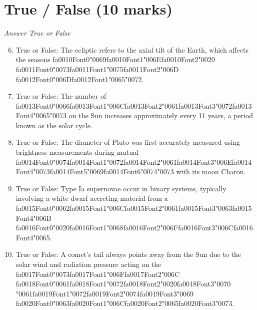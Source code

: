 \documentclass[12pt]{article}
\begin{document}
\section*{True / False (10 marks)}
\textit{Answer True or False}
\begin{enumerate}[label=\arabic*.]
\setcounter{enumi}{5}
\item True or False: The ecliptic refers to the axial tilt of the Earth, which affects the seasons {\csname fa0010Font0\endcsname\char"0069}{\csname fa0010Font1\endcsname\char"006E}{\csname fa0010Font2\endcsname\char"0020} {\csname fa0011Font0\endcsname\char"0073}{\csname fa0011Font1\endcsname\char"0075}{\csname fa0011Font2\endcsname\char"006D} {\csname fa0012Font0\endcsname\char"006D}{\csname fa0012Font1\endcsname\char"0065}{\char"0072}.
\item True or False: The number of {\csname fa0013Font0\endcsname\char"0066}{\csname fa0013Font1\endcsname\char"006C}{\csname fa0013Font2\endcsname\char"0061}{\csname fa0013Font3\endcsname\char"0072}{\csname fa0013Font4\endcsname\char"0065}{\char"0073} on the Sun increases approximately every 11 years, a period known as the solar cycle.
\item True or False: The diameter of Pluto was first accurately measured using brightness measurements during mutual {\csname fa0014Font0\endcsname\char"0074}{\csname fa0014Font1\endcsname\char"0072}{\csname fa0014Font2\endcsname\char"0061}{\csname fa0014Font3\endcsname\char"006E}{\csname fa0014Font4\endcsname\char"0073}{\csname fa0014Font5\endcsname\char"0069}{\csname fa0014Font6\endcsname\char"0074}{\char"0073} with its moon Charon.
\item True or False: Type Ia supernovae occur in binary systems, typically involving a white dwarf accreting material from a {\csname fa0015Font0\endcsname\char"0062}{\csname fa0015Font1\endcsname\char"006C}{\csname fa0015Font2\endcsname\char"0061}{\csname fa0015Font3\endcsname\char"0063}{\csname fa0015Font4\endcsname\char"006B} {\csname fa0016Font0\endcsname\char"0020}{\csname fa0016Font1\endcsname\char"0068}{\csname fa0016Font2\endcsname\char"006F}{\csname fa0016Font3\endcsname\char"006C}{\csname fa0016Font4\endcsname\char"0065}.
\item True or False: A comet's tail always points away from the Sun due to the solar wind and radiation pressure acting on the {\csname fa0017Font0\endcsname\char"0073}{\csname fa0017Font1\endcsname\char"006F}{\csname fa0017Font2\endcsname\char"006C} {\csname fa0018Font0\endcsname\char"0061}{\csname fa0018Font1\endcsname\char"0072}{\csname fa0018Font2\endcsname\char"0020}{\csname fa0018Font3\endcsname\char"0070} {\char"0061}{\csname fa0019Font1\endcsname\char"0072}{\csname fa0019Font2\endcsname\char"0074}{\csname fa0019Font3\endcsname\char"0069} {\csname fa0020Font0\endcsname\char"0063}{\csname fa0020Font1\endcsname\char"006C}{\csname fa0020Font2\endcsname\char"0065}{\csname fa0020Font3\endcsname\char"0073}.
\end{enumerate}
\end{document}
